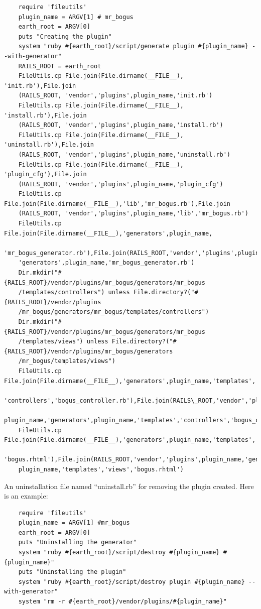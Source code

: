 \documentclass{article}
\begin{document}
\begin{verbatim}
    require 'fileutils' 
    plugin_name = ARGV[1] # mr_bogus 
    earth_root = ARGV[0]  
    puts "Creating the plugin" 
    system "ruby #{earth_root}/script/generate plugin #{plugin_name} --with-generator" 
    RAILS_ROOT = earth_root 
    FileUtils.cp File.join(File.dirname(__FILE__), 'init.rb'),File.join
    (RAILS_ROOT, 'vendor','plugins',plugin_name,'init.rb')  
    FileUtils.cp File.join(File.dirname(__FILE__), 'install.rb'),File.join
    (RAILS_ROOT, 'vendor','plugins',plugin_name,'install.rb')  
    FileUtils.cp File.join(File.dirname(__FILE__), 'uninstall.rb'),File.join
    (RAILS_ROOT, 'vendor','plugins',plugin_name,'uninstall.rb')  
    FileUtils.cp File.join(File.dirname(__FILE__), 'plugin_cfg'),File.join
    (RAILS_ROOT, 'vendor','plugins',plugin_name,'plugin_cfg') 
    FileUtils.cp File.join(File.dirname(__FILE__),'lib','mr_bogus.rb'),File.join
    (RAILS_ROOT, 'vendor','plugins',plugin_name,'lib','mr_bogus.rb')  
    FileUtils.cp File.join(File.dirname(__FILE__),'generators',plugin_name,
    'mr_bogus_generator.rb'),File.join(RAILS_ROOT,'vendor','plugins',plugin_name,
    'generators',plugin_name,'mr_bogus_generator.rb')  
    Dir.mkdir("#{RAILS_ROOT}/vendor/plugins/mr_bogus/generators/mr_bogus
    /templates/controllers") unless File.directory?("#{RAILS_ROOT}/vendor/plugins
    /mr_bogus/generators/mr_bogus/templates/controllers") 
    Dir.mkdir("#{RAILS_ROOT}/vendor/plugins/mr_bogus/generators/mr_bogus
    /templates/views") unless File.directory?("#{RAILS_ROOT}/vendor/plugins/mr_bogus/generators
    /mr_bogus/templates/views") 
    FileUtils.cp File.join(File.dirname(__FILE__),'generators',plugin_name,'templates',
    'controllers','bogus_controller.rb'),File.join(RAILS\_ROOT,'vendor','plugins',
    plugin_name,'generators',plugin_name,'templates','controllers','bogus_controller.rb') 
    FileUtils.cp File.join(File.dirname(__FILE__),'generators',plugin_name,'templates','views',
    'bogus.rhtml'),File.join(RAILS_ROOT,'vendor','plugins',plugin_name,'generators',
    plugin_name,'templates','views','bogus.rhtml') 
\end{verbatim}

\noindent 
An uninstallation file named ``uninstall.rb'' for removing the plugin created. Here is an example:

\begin{verbatim}
    require 'fileutils' 
    plugin_name = ARGV[1] #mr_bogus 
    earth_root = ARGV[0]  
    puts "Uninstalling the generator" 
    system "ruby #{earth_root}/script/destroy #{plugin_name} #{plugin_name}" 
    puts "Uninstalling the plugin" 
    system "ruby #{earth_root}/script/destroy plugin #{plugin_name} --with-generator" 
    system "rm -r #{earth_root}/vendor/plugins/#{plugin_name}"
\end{verbatim}
\end{document}
